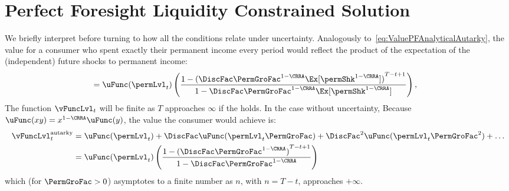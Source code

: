 \documentclass[\econtexRoot/BufferStockTheory]{subfiles}
\begin{document}
\let\TableWidth\relax
{\newlength\TableWidth}

\hypertarget{ApndxLiqConstr}{}
\section{Perfect Foresight Liquidity Constrained Solution}\label{sec:ApndxLiqConstr}

\hypertarget{Autarky-Value}{}
We briefly interpret {\FVAC} before turning to how all the conditions relate under uncertainty. Analogously to~\eqref{eq:ValuePFAnalyticalAutarky}, the value for a consumer who spent exactly their permanent income every period would reflect the product of the expectation of the (independent) future shocks to permanent income:\hypertarget{uInvEuPermShkDefn}{}
\begin{align*}
             & = \uFunc(\permLvl_{t})\left(\frac{1-{(\DiscFac \PermGroFac^{1-\CRRA}\Ex[\permShk^{1-\CRRA}])}^{T-t+1}}{1-\DiscFac \PermGroFac^{1-\CRRA} \Ex[\permShk^{1-\CRRA}]}\right),
\end{align*}
%
The function $\vFuncLvl_{t}$ will be finite as $T$ approaches $\infty$ if the {\FVAC} holds. In the case without uncertainty, Because $\uFunc(xy) = x^{1-\CRRA}\uFunc(y)$, the value the consumer would achieve is: 
%
%
%
\begin{equation}\label{eq:ValuePFAnalyticalAutarky}\begin{gathered}\begin{aligned}  
      \vFuncLvl_{t}^{\text{autarky}}  & = \uFunc(\permLvl_{t})+\DiscFac \uFunc(\permLvl_{t}\PermGroFac)+\DiscFac^{2} \uFunc(\permLvl_{t} \PermGroFac^{2})+\ldots
      \\  & = \uFunc(\permLvl_{t})\left(\frac{1-{(\DiscFac \PermGroFac^{1-\CRRA})}^{T-t+1}}{1-\DiscFac \PermGroFac^{1-\CRRA}}\right) \notag
    \end{aligned}\end{gathered}\end{equation}
which (for $\PermGroFac>0$) asymptotes to a finite number as $n$, with $n=T-t$, approaches $+\infty$. 
\end{document}
